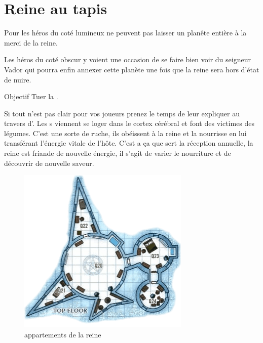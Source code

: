 \section{Reine au tapis}

\lettrine{\jedifont{\$}} Pour les héros du coté lumineux ne peuvent pas laisser un planête entière à la merci de la reine. 

\lettrine{\jedifont{\#}} Les héros du coté obscur y voient une occasion de se faire bien voir du seigneur Vador qui pourra enfin annexer cette planète une fois que la reine sera hors d’état de nuire.

\begin{paperbox}{Objectif}
Tuer la .
\end{paperbox}

Si tout n’est pas clair pour vos joueurs prenez le temps de leur expliquer au travers d’. Les s viennent se loger dans le cortex cérébral et font des victimes des légumes. C’est une sorte de ruche, ils obéissent à la reine et la nourrisse en lui transférant l’énergie vitale de l’hôte. C’est a ça que sert la réception annuelle, la reine est friande de nouvelle énergie, il s’agit de varier le nourriture et de découvrir de nouvelle saveur.

\begin{figure}[h]
\noindent\includegraphics[width=\linewidth]{_img/places/queen-quarter.png}
\caption{appartements de la reine\label{fig:queen-quarter}}
\end{figure}

